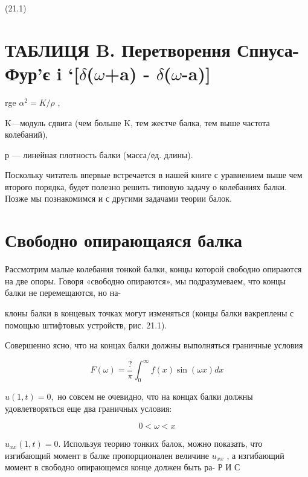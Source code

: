\documentclass[
  ukrainian,
]{article}
\begin{document}
(21.1)

\section{\texorpdfstring{ТАБЛИЦЯ B. Перетворення Спнуса-Фур'є i
`{[}\(\delta\)(\(\omega\)+a) -
\(\delta\)(\(\omega\)-a){]}}{ТАБЛИЦЯ B. Перетворення Спнуса-Фур'є i `{[}\textbackslash delta(\textbackslash omega+a) - \textbackslash delta(\textbackslash omega-a){]}}}\label{ux442ux430ux431ux43bux438ux446ux44f-b.-ux43fux435ux440ux435ux442ux432ux43eux440ux435ux43dux43dux44f-ux441ux43fux43dux443ux441ux430-ux444ux443ux440ux454-i-deltaomegaa---deltaomega-a}

rge \(\alpha^2 = K/\rho\) ,

K---модуль сдвига (чем больше K, тем жестче балка, тем выше частота
колебаний),

р --- линейная плотность балки (масса/ед. длины).

Поскольку читатель впервые встречается в нашей книге с уравнением выше
чем второго порядка, будет полезно решить типовую задачу о колебаниях
балки. Позже мы познакомимся и с другими задачами теории балок.

\section{Свободно опирающаяся
балка}\label{ux441ux432ux43eux431ux43eux434ux43dux43e-ux43eux43fux438ux440ux430ux44eux449ux430ux44fux441ux44f-ux431ux430ux43bux43aux430}

Рассмотрим малые колебания тонкой балки, концы которой свободно
опираются на две опоры. Говоря «свободно опираются», мы подразумеваем,
что концы балки не перемещаются, но на-

клоны балки в концевых точках могут изменяться (концы балки вакреплены с
помощью штифтовых устройств, рис. 21.1).

Совершенно ясно, что на концах балки должны выполняться граничные
условия

\[
F(\omega) = \frac{?}{\pi} \int_{0}^{\infty} f(x) \sin(\omega x) dx
\]

\(u(1, t) = 0,\) но совсем не очевидно, что на концах балки должны
удовлетворяться еще два граничных условия:

\[
0 < \omega < x
\]

\(u_{xx}(1, t) = 0.\) Используя теорию тонких балок, можно показать, что
изгибающий момент в балке пропорционален величине \(u_{xx}\) , а
изгибающий момент в свободно опирающемся конце должен быть ра- Р И С
\end{document}
